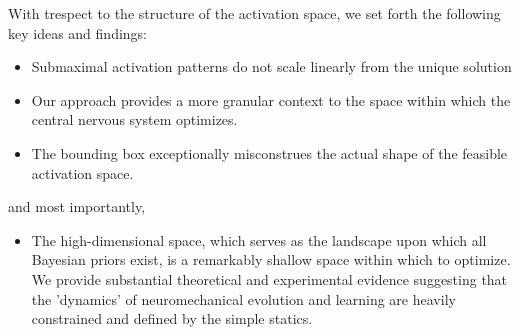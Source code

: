With trespect to the structure of the activation space, we set forth the following key ideas and findings:
\begin{itemize}
\item {Submaximal activation patterns do not scale linearly from the unique solution}
\item {Our approach provides a more granular context to the space within which the central nervous system optimizes.}
\item {The bounding box exceptionally misconstrues the actual shape of the feasible activation space.}
\end{itemize}
and most importantly,
\begin{itemize}
\item {The high-dimensional space, which serves as the landscape upon which all Bayesian priors exist, is a remarkably shallow space within which to optimize. We provide substantial theoretical and experimental evidence suggesting that the 'dynamics' of neuromechanical evolution and learning are heavily constrained and defined by the simple statics.}
\end{itemize}

